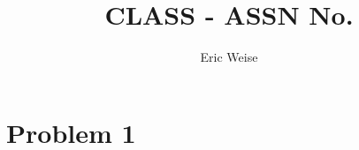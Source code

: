 \documentclass{article}
\title{CLASS - ASSN No.}
\author{Eric Weise}
\begin{document}
\section*{Problem 1}
\end{document}
